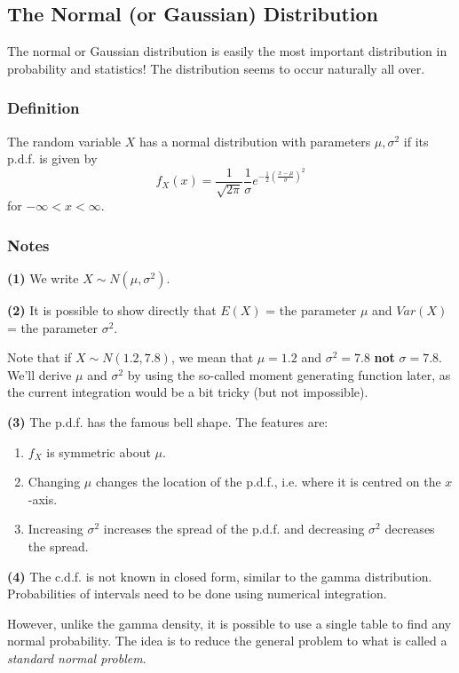 \documentclass[12pt]{article}
\begin{document}
\subsection{The Normal (or Gaussian) Distribution}
The normal or Gaussian distribution is easily the most important distribution in probability and statistics! The distribution seems to occur naturally all over.

\subsubsection{Definition}
The random variable $X$ has a normal distribution with parameters $\mu, \sigma^2$ if its p.d.f. is given by
\[
    f_X (x) = \frac{1}{\sqrt{2\pi}} \frac{1}{\sigma} e^{- \frac{1}{2} (\frac{x - \mu}{\sigma})^2}
\]
for $-\infty < x < \infty$.

\subsubsection{Notes}
\textbf{(1)}
We write $X \sim N(\mu, \sigma^2)$.

\textbf{(2)}
It is possible to show directly that $E(X)$ = the parameter $\mu$ and $Var(X)$ = the parameter $\sigma^2$. 

Note that if $X \sim N(1.2, 7.8)$, we mean that $\mu = 1.2$ and $\sigma^2 = 7.8$ \textbf{not} $\sigma = 7.8$. We'll derive $\mu$ and $\sigma^2$ by using the so-called moment generating function later, as the current integration would be a bit tricky (but not impossible).

\textbf{(3)}
The p.d.f. has the famous bell shape. The features are:
\begin{enumerate}
    \item $f_X$ is symmetric about $\mu$.
    \item Changing $\mu$ changes the location of the p.d.f., i.e. where it is centred on the $x$-axis.
    \item Increasing $\sigma^2$ increases the spread of the p.d.f. and decreasing $\sigma^2$ decreases the spread.
\end{enumerate}

\textbf{(4)}
The c.d.f. is not known in closed form, similar to the gamma distribution. Probabilities of intervals need to be done using numerical integration. 

However, unlike the gamma density, it is possible to use a single table to find any normal probability. The idea is to reduce the general problem to what is called a \emph{standard normal problem}.
\end{document}
